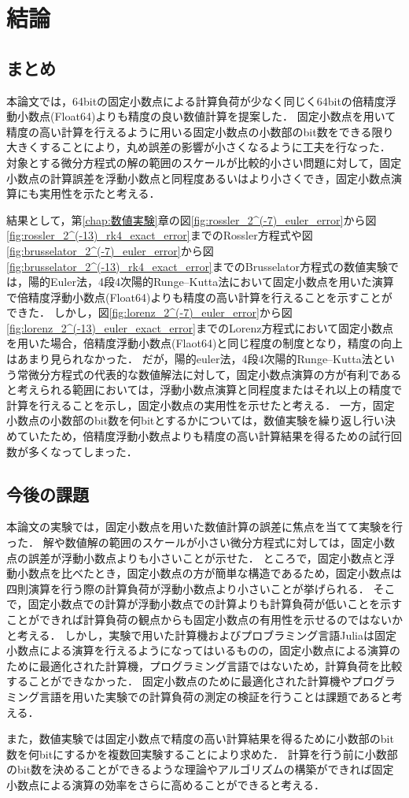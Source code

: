 \chapter{結論}
\label{chap:結論}
\section{まとめ}
本論文では，64bitの固定小数点による計算負荷が少なく同じく64bitの倍精度浮動小数点(Float64)よりも精度の良い数値計算を提案した．
固定小数点を用いて精度の高い計算を行えるように用いる固定小数点の小数部のbit数をできる限り大きくすることにより，丸め誤差の影響が小さくなるように工夫を行なった．
対象とする微分方程式の解の範囲のスケールが比較的小さい問題に対して，固定小数点の計算誤差を浮動小数点と同程度あるいはより小さくでき，固定小数点演算にも実用性を示たと考える．


結果として，第\ref{chap:数値実験}章の図\ref{fig:rossler_2^(-7)_euler_error}から図\ref{fig:rossler_2^(-13)_rk4_exact_error}までのRossler方程式や図\ref{fig:brusselator_2^(-7)_euler_error}から図\ref{fig:brusselator_2^(-13)_rk4_exact_error}までのBrusselator方程式の数値実験では，陽的Euler法，4段4次陽的Runge--Kutta法において固定小数点を用いた演算で倍精度浮動小数点(Float64)よりも精度の高い計算を行えることを示すことができた．
しかし，図\ref{fig:lorenz_2^(-7)_euler_error}から図\ref{fig:lorenz_2^(-13)_euler_exact_error}までのLorenz方程式において固定小数点を用いた場合，倍精度浮動小数点(Flaot64)と同じ程度の制度となり，精度の向上はあまり見られなかった．
だが，陽的euler法，4段4次陽的Runge--Kutta法という常微分方程式の代表的な数値解法に対して，固定小数点演算の方が有利であると考えられる範囲においては，浮動小数点演算と同程度またはそれ以上の精度で計算を行えることを示し，固定小数点の実用性を示せたと考える．
一方，固定小数点の小数部のbit数を何bitとするかについては，数値実験を繰り返し行い決めていたため，倍精度浮動小数点よりも精度の高い計算結果を得るための試行回数が多くなってしまった．

\section{今後の課題}
本論文の実験では，固定小数点を用いた数値計算の誤差に焦点を当てて実験を行った．
解や数値解の範囲のスケールが小さい微分方程式に対しては，固定小数点の誤差が浮動小数点よりも小さいことが示せた．
ところで，固定小数点と浮動小数点を比べたとき，固定小数点の方が簡単な構造であるため，固定小数点は四則演算を行う際の計算負荷が浮動小数点より小さいことが挙げられる．
そこで，固定小数点での計算が浮動小数点での計算よりも計算負荷が低いことを示すことができれば計算負荷の観点からも固定小数点の有用性を示せるのではないかと考える．
しかし，実験で用いた計算機およびプロブラミング言語Juliaは固定小数点による演算を行えるようになってはいるものの，固定小数点による演算のために最適化された計算機，プログラミング言語ではないため，計算負荷を比較することができなかった．
固定小数点のために最適化された計算機やプログラミング言語を用いた実験での計算負荷の測定の検証を行うことは課題であると考える．


また，数値実験では固定小数点で精度の高い計算結果を得るために小数部のbit数を何bitにするかを複数回実験することにより求めた．
計算を行う前に小数部のbit数を決めることができるような理論やアルゴリズムの構築ができれば固定小数点による演算の効率をさらに高めることができると考える．